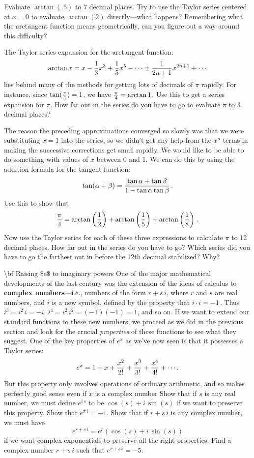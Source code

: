 {{{{\numa Evaluate $\arctan(.5)$ to 7 decimal places.
\sub Try to use the Taylor series centered at $x=0$ to evaluate $\arctan(2)$ directly---what happens?  Remembering what the arctangent function means geometrically, can you figure out a way around this difficulty?

  \hspace{.25in} The Taylor series expansion for the arctangent
 function:
 \[
\arctan{x} = x-{1 \over 3}x^3 + {1 \over 5} x^5 - \cdots \pm {1 \over {2n+1}}x^{2n+1} +\cdots
\]
  lies behind many of the methods for getting lots of decimals of $\pi$ rapidly.  For instance, since $\tan({\pi \over 4}) = 1$, we have ${\pi\over 4} = \arctan{1}$.  Use this to get a series expansion for $\pi$.  How far out in the series do you have to go to evaluate $\pi$ to 3 decimal places?


\sub The reason the preceding approximations converged so slowly was that we were substituting $x=1$ into the series, so we didn't get any help from the $x^n$ terms in making the successive corrections get small rapidly.  We would like to be able to do something with values of $x$  between 0 and 1.  We can do this by using the addition formula for the tangent function:
\[
\tan(\alpha + \beta ) = {{\tan\alpha +\tan\beta} \over 1-{\tan\alpha}\tan\beta} \, .
\]
Use this to show that
\[
{\pi \over 4}=\arctan\left({1 \over 2}\right)+\arctan\left({1 \over 5}\right)+\arctan\left({1 \over 8}\right) \, .
\]
Now use the Taylor series for each of these three expressions to calculate $\pi$ to 12 decimal places.  How far out in the series do you have to go?  Which series did you have to go the farthest out in before the 12th decimal stabilized? Why?

\num {\bf Raising $e$ to imaginary powers}  One of the major mathematical developments of the last century was the extension of the ideas of calculus to {\bf complex numbers}---i.e., numbers of the form $r+s\,i$, where $r$ and $s$ are real numbers, and $i$ is a new symbol, defined by the property that $i\cdot i=-1$\,.  Thus $i^3=i^2\,i=-i$, $i^4=i^2\,i^2=(-1)(-1)=1$, and so on. If we want to extend our standard functions to these new numbers, we proceed as we did in the previous section and look for the crucial {\em properties} of these functions to see what they suggest.  One of the key properties of $e^x$ as we've now seen is that it possesses a Taylor series:
\[
e^x={\displaystyle 1 + x + {x^2 \over 2!} + {x^3 \over 3!} 
                + {x^4 \over 4!} + \cdots  } \,.
\]
But this property only involves operations of ordinary arithmetic, and so makes perfectly good sense even if $x$ is a complex number
\sub Show that if $s$ is any real number, we must define $e^{i\,s}$ to be $\cos(s)+i\,\sin(s)$ if we want to preserve this property.
\sub Show that $e^{\pi\,i}=-1$.
\sub  Show that if $r+s\,i$ is any complex number, we must have
\[
e^{r+s\,i}=e^r(\cos(s)+i\,\sin(s))
\]
if we want complex exponentials to preserve all the right properties.
\sub Find a complex number $r+s\,i$ such that $e^{r+s\,i}= -5$.

}}}}
